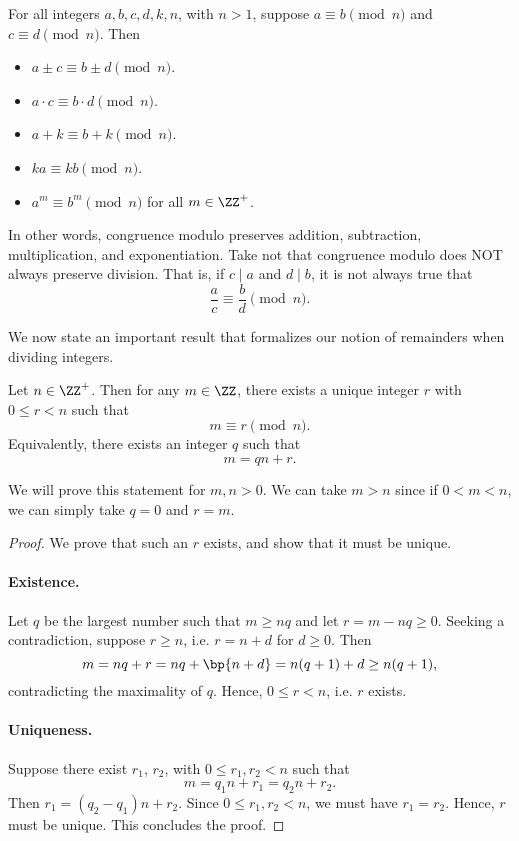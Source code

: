 \begin{proposition}
    For all integers $a, b, c, d, k, n$, with $n > 1$, suppose $a \equiv b \pmod{n}$ and $c \equiv d \pmod{n}$. Then
    \begin{itemize}
        \item $a \pm c \equiv b \pm d \pmod{n}$.
        \item $a \cdot c \equiv b \cdot d \pmod{n}$.
        \item $a + k \equiv b + k \pmod{n}$.
        \item $ka \equiv kb \pmod{n}$.
        \item $a^m \equiv b^m \pmod{n}$ for all $m \in \ZZ^+$.
    \end{itemize}
\end{proposition}

In other words, congruence modulo preserves addition, subtraction, multiplication, and exponentiation. Take not that congruence modulo does NOT always preserve division. That is, if $c \mid a$ and $d \mid b$, it is not always true that \[\frac{a}{c} \equiv \frac{b}{d} \pmod{n}.\]

We now state an important result that formalizes our notion of remainders when dividing integers.

\begin{theorem}
    Let $n \in \ZZ^+$. Then for any $m \in \ZZ$, there exists a unique integer $r$ with $0 \leq r < n$ such that \[m \equiv r \pmod{n}.\] Equivalently, there exists an integer $q$ such that \[m = qn + r.\]
\end{theorem}
We will prove this statement for $m, n > 0$. We can take $m > n$ since if $0 < m < n$, we can simply take $q = 0$ and $r = m$.
\begin{proof}
    We prove that such an $r$ exists, and show that it must be unique.

    \item\paragraph{Existence.} Let $q$ be the largest number such that $m \geq nq$ and let $r = m - nq \geq 0$. Seeking a contradiction, suppose $r \geq n$, i.e. $r = n + d$ for $d \geq 0$. Then \[m = nq + r = nq + \bp{n + d} = n(q+1) + d \geq n(q+1),\] contradicting the maximality of $q$. Hence, $0 \leq r < n$, i.e. $r$ exists.

    \item\paragraph{Uniqueness.} Suppose there exist $r_1$, $r_2$, with $0 \leq r_1, r_2 < n$ such that \[m = q_1 n + r_1 = q_2 n + r_2.\] Then $r_1 = (q_2 - q_1) n + r_2$. Since $0 \leq r_1, r_2 < n$, we must have $r_1 = r_2$. Hence, $r$ must be unique. This concludes the proof.
\end{proof}
